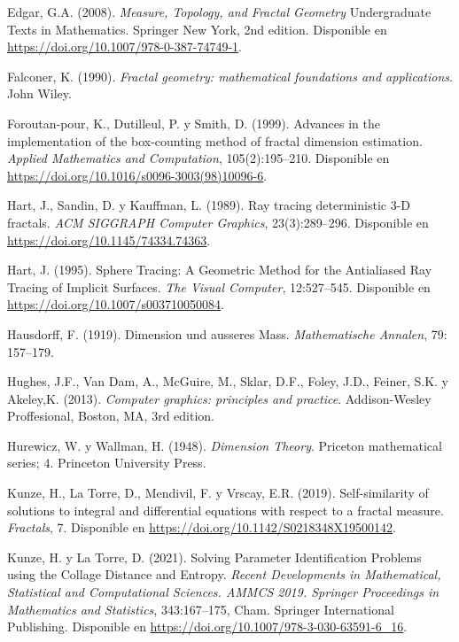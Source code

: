 \begin{thebibliography}{99}
     Edgar, G.A. (2008). \textit{Measure, Topology, and Fractal Geometry} Undergraduate Texts in Mathematics. Springer New York, 2nd edition. Disponible en \url{https://doi.org/10.1007/978-0-387-74749-1}.

     Falconer, K. (1990). \textit{Fractal geometry: mathematical foundations and applications}. John Wiley.

     Foroutan-pour, K., Dutilleul, P. y Smith, D. (1999). Advances in the implementation of the box-counting method of fractal dimension estimation. \textit{Applied Mathematics and Computation}, 105(2):195--210. Disponible en \url{https://doi.org/10.1016/s0096-3003(98)10096-6}.

     Hart, J., Sandin, D. y Kauffman, L. (1989). Ray tracing deterministic 3-D fractals. \textit{ACM SIGGRAPH Computer Graphics}, 23(3):289--296. Disponible en \url{https://doi.org/10.1145/74334.74363}.

     Hart, J. (1995). Sphere Tracing: A Geometric Method for the Antialiased Ray Tracing of Implicit Surfaces. \textit{The Visual Computer}, 12:527--545. Disponible en \url{https://doi.org/10.1007/s003710050084}.

     Hausdorff, F. (1919). Dimension und ausseres Mass. \textit{Mathematische Annalen}, 79: 157--179.

     Hughes, J.F., Van Dam, A., McGuire, M., Sklar, D.F., Foley, J.D., Feiner, S.K. y Akeley,K. (2013). \textit{Computer graphics: principles and practice}. Addison-Wesley Proffesional, Boston, MA, 3rd edition.

    Hurewicz, W. y Wallman, H. (1948). \textit{Dimension Theory}. Priceton mathematical series; 4. Princeton University Press.

     Kunze, H., La Torre, D., Mendivil, F. y Vrscay, E.R. (2019). Self-similarity of solutions to integral and differential equations with respect to a fractal measure. \textit{Fractals}, 7. Disponible en \url{https://doi.org/10.1142/S0218348X19500142}.

     Kunze, H. y La Torre, D. (2021). Solving Parameter Identification Problems using the Collage Distance and Entropy. \textit{Recent Developments in Mathematical, Statistical and Computational Sciences. AMMCS 2019. Springer Proceedings in Mathematics and Statistics}, 343:167--175, Cham. Springer International Publishing. Disponible en \url{https://doi.org/10.1007/978-3-030-63591-6_16}.


\end{thebibliography}
